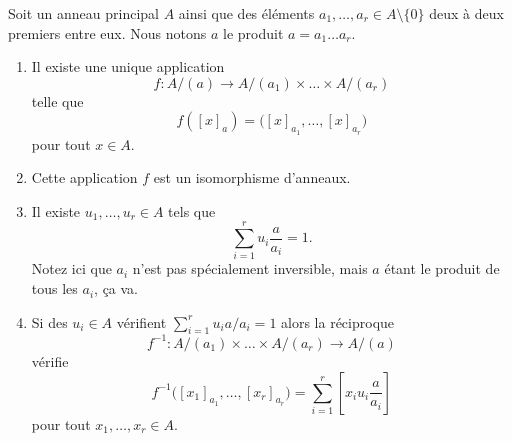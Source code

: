 \begin{theorem}	\label{ThofPXwiM}
	Soit un anneau principal \( A\) ainsi que des éléments \( a_1,\ldots,a_r\in A\setminus\{ 0 \}\) deux à deux premiers entre eux. Nous notons \( a\) le produit \( a=a_1\ldots a_r\).

	\begin{enumerate}
		\item		\label{ITEMooWBSWooGWjnNx}
		      Il existe une unique application
		      \begin{equation}
			      f \colon A/(a)\to A/(a_1)\times\ldots\times A/(a_r)
		      \end{equation}
		      telle que
		      \begin{equation}
			      f([x]_a)=\big( [x]_{a_1},\ldots,[x]_{a_r} \big)
		      \end{equation}
		      pour tout \( x\in A\).
		\item		\label{ITEMooANYPooGPgEQc}
		      Cette application \( f\) est un isomorphisme d'anneaux.
		\item		\label{ITEMooTUOKooHcSwTD}
		      Il existe \( u_1,\ldots,u_r\in A\) tels que
		      \begin{equation}
			      \sum_{i=1}^ru_i\frac{ a }{ a_i }=1.
		      \end{equation}
		      Notez ici que \( a_i\) n'est pas spécialement inversible, mais \( a\) étant le produit de tous les \( a_i\), ça va.
		\item		\label{ITEMooGXOEooUdKmzU}
		      Si des \( u_i\in A\) vérifient \( \sum_{i=1}^ru_ia/a_i=1\) alors la réciproque
		      \begin{equation}
			      f^{-1} \colon A/(a_1)\times \ldots\times A/(a_r)\to  	A/(a)
		      \end{equation}
		      vérifie
		      \begin{equation}
			      f^{-1}\big( [x_1]_{a_1},\ldots,[x_r]_{a_r} \big)=\sum_{i=1}^r[x_iu_i\frac{ a }{ a_i }]
		      \end{equation}
		      pour tout \( x_1,\ldots,x_r\in A\).
	\end{enumerate}
\end{theorem}

